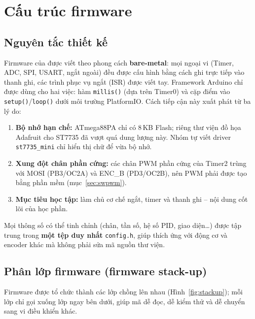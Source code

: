 \chapter{Cấu trúc firmware}
\label{ch:firmware}

\section{Nguyên tắc thiết kế}
Firmware của \proj{} được viết theo phong cách \textbf{bare-metal}: mọi ngoại vi (Timer, ADC, SPI, USART, ngắt ngoài) đều được cấu hình bằng cách ghi trực tiếp vào thanh ghi, các trình phục vụ ngắt (ISR) được viết tay. Framework Arduino chỉ được dùng cho hai việc: hàm \texttt{millis()} (dựa trên Timer0) và cặp điểm vào \texttt{setup()}/\texttt{loop()} dưới môi trường PlatformIO. Cách tiếp cận này xuất phát từ ba lý do:
\begin{enumerate}
  \item \textbf{Bộ nhớ hạn chế:} ATmega88PA chỉ có 8\,KB Flash; riêng thư viện đồ họa Adafruit cho ST7735 đã vượt quá dung lượng này. Nhóm tự viết driver \texttt{st7735\_mini} chỉ hiển thị chữ để vừa bộ nhớ.
  \item \textbf{Xung đột chân phần cứng:} các chân PWM phần cứng của Timer2 trùng với MOSI (PB3/OC2A) và ENC\_B (PD3/OC2B), nên PWM phải được tạo bằng phần mềm (mục~\ref{sec:swpwm}).
  \item \textbf{Mục tiêu học tập:} làm chủ cơ chế ngắt, timer và thanh ghi -- nội dung cốt lõi của học phần.
\end{enumerate}
Mọi thông số có thể tinh chỉnh (chân, tần số, hệ số PID, giao diện\ldots) được tập trung trong \textbf{một tệp duy nhất} \texttt{config.h}, giúp \proj{} thích ứng với động cơ và encoder khác mà không phải sửa mã nguồn thư viện.

\section{Phân lớp firmware (firmware stack-up)}

Firmware được tổ chức thành các lớp chồng lên nhau (Hình~\ref{fig:stackup}); mỗi lớp chỉ gọi xuống lớp ngay bên dưới, giúp mã dễ đọc, dễ kiểm thử và dễ chuyển sang vi điều khiển khác.

